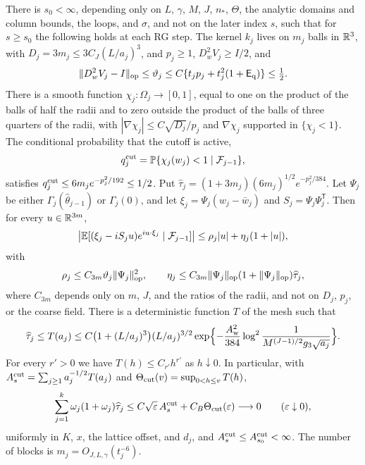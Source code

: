 \begin{lemma}
There is $s_0<\infty$, depending only on $L$, $\gamma$, $M$, $J$, $n_*$, $\Theta$, the analytic domains and column bounds, the loops, and $\sigma$, and not on the later index $s$, such that for $s\ge s_0$ the following holds at each RG step. The kernel $k_j$ lives on $m_j$ balls in $\mathbb R^3$, with $D_j=3m_j\le3C_J(L/a_j)^3$, and $p_j\ge1$, $D_w^2V_j\ge I/2$, and
\[
 \|D_w^2V_j-I\|_{\rm op}\le\vartheta_j\le C\{t_jp_j+t_j^2(1+\mathsf E_{\rm q})\}\le\tfrac12.
\]
There is a smooth function $\chi_j:\Omega_j\to[0,1]$, equal to one on the product of the balls of half the radii and to zero outside the product of the balls of three quarters of the radii, with $|\nabla\chi_j|\le C\sqrt{D_j}/p_j$ and $\nabla\chi_j$ supported in $\{\chi_j<1\}$. The conditional probability that the cutoff is active,
\[
 q_j^{\rm cut}=\mathbb P\{\chi_j(w_j)<1\mid\mathcal F_{j-1}\},
\]
satisfies $q_j^{\rm cut}\le6m_je^{-p_j^2/192}\le1/2$. Put $\widehat\tau_j=(1+3m_j)(6m_j)^{1/2}e^{-p_j^2/384}$. Let $\Psi_j$ be either $\Gamma_j(\widehat\theta_{j-1})$ or $\Gamma_j(0)$, and let $\xi_j=\Psi_j(w_j-\bar w_j)$ and $S_j=\Psi_j\Psi_j^{\mathsf T}$. Then for every $u\in\mathbb R^{3m}$,
\[
 \bigl|\mathbb E[(\xi_j-iS_ju)e^{iu\cdot\xi_j}\mid\mathcal F_{j-1}]\bigr|\le\rho_j|u|+\eta_j(1+|u|),
\]
with
\[
 \rho_j\le C_{3m}\vartheta_j\|\Psi_j\|_{\rm op}^2,\qquad \eta_j\le C_{3m}\|\Psi_j\|_{\rm op}(1+\|\Psi_j\|_{\rm op})\widehat\tau_j,
\]
where $C_{3m}$ depends only on $m$, $J$, and the ratios of the radii, and not on $D_j$, $p_j$, or the coarse field. There is a deterministic function $T$ of the mesh such that
\[
 \widehat\tau_j\le T(a_j)\le C\bigl(1+(L/a_j)^3\bigr)(L/a_j)^{3/2}\exp\Bigl\{-\frac{A_{\rm w}^2}{384}\log^2\frac1{M^{(J-1)/2}g_3\sqrt{a_j}}\Bigr\}.
\]
For every $r'>0$ we have $T(h)\le C_{r'}h^{r'}$ as $h\downarrow0$. In particular, with $A_s^{\rm cut}=\sum_{j\ge1}a_j^{-1/2}T(a_j)$ and $\Theta_{\rm cut}(v)=\sup_{0<h\le v}T(h)$,
\[
 \sum_{j=1}^k\omega_j(1+\omega_j)\widehat\tau_j\le C\sqrt\varepsilon\,A_s^{\rm cut}+C_B\Theta_{\rm cut}(\varepsilon)\longrightarrow0\qquad(\varepsilon\downarrow0),
\]
uniformly in $K$, $x$, the lattice offset, and $d_j$, and $A_s^{\rm cut}\le A_{s_0}^{\rm cut}<\infty$. The number of blocks is $m_j=O_{J,L,\gamma}(t_j^{-6})$.
\end{lemma}

